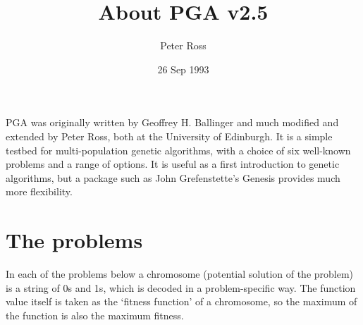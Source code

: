 
\setlength{\oddsidemargin}{-0.5in}
\setlength{\evensidemargin}{-0.5in}
\setlength{\textwidth}{7in}

\title{About PGA v2.5}
\author{Peter Ross}
\date{26 Sep 1993}


\maketitle

PGA was originally written by Geoffrey H. Ballinger and much modified
and extended by Peter Ross, both at the University of Edinburgh. It is a
simple testbed for multi-population genetic algorithms, with a choice of
six well-known problems and a range of options. It is useful as a first
introduction to genetic algorithms, but a package such as John
Grefenstette's Genesis provides much more flexibility.

\section*{The problems}

In each of the problems below a chromosome (potential solution of the
problem) is a string of 0s and 1s, which is decoded in a problem-specific way.
The function value itself is taken as the `fitness function' of a
chromosome, so the maximum of the function is also the maximum fitness.

